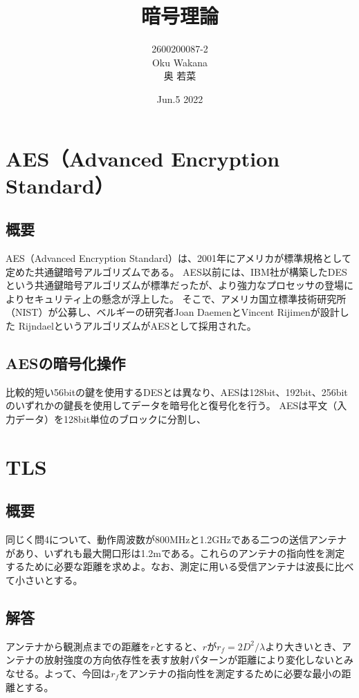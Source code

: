 \documentclass[dvipdfmx,autodetect-engine,titlepage]{jsarticle}
\title{暗号理論\\
}
\author{2600200087-2\\Oku Wakana\\奥 若菜}
\date{Jun.5 2022}
\begin{document}
\maketitle

\section{AES（Advanced Encryption Standard）}
\subsection{概要}
AES（Advanced Encryption Standard）は、2001年にアメリカが標準規格として定めた共通鍵暗号アルゴリズムである。
AES以前には、IBM社が構築したDESという共通鍵暗号アルゴリズムが標準だったが、より強力なプロセッサの登場によりセキュリティ上の懸念が浮上した。
そこで、アメリカ国立標準技術研究所（NIST）が公募し、ベルギーの研究者Joan DaemenとVincent Rijimenが設計した
RijndaelというアルゴリズムがAESとして採用された。

\subsection{AESの暗号化操作}
比較的短い56bitの鍵を使用するDESとは異なり、AESは128bit、192bit、256bitのいずれかの鍵長を使用してデータを暗号化と復号化を行う。
AESは平文（入力データ）を128bit単位のブロックに分割し、
\section{TLS}
\subsection{概要}
同じく問4について、動作周波数が800MHzと1.2GHzである二つの送信アンテナがあり、いずれも最大開口形は1.2mである。これらのアンテナの指向性を測定するために必要な距離を求めよ。なお、測定に用いる受信アンテナは波長に比べて小さいとする。

\subsection{解答}
アンテナから観測点までの距離を\begin{math}r\end{math}とすると、\begin{math}
  rが r_f=2D^2/ \lambda 
\end{math}より大きいとき、アンテナの放射強度の方向依存性を表す放射パターンが距離により変化しないとみなせる。よって、今回は\begin{math}
  r_f
\end{math}をアンテナの指向性を測定するために必要な最小の距離とする。\\
\end{document}
